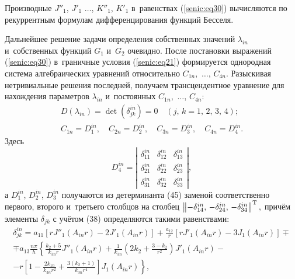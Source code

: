 Производные ${J}''_1$, ${J}'_1$ $\dots$, ${K}''_1$, ${K}'_1 $ в~равенствах (\ref{senic:eq30}) 
вычисляются по рекуррентным формулам дифференцирования функций Бесселя.

Дальнейшее решение задачи определения собственных значений $\lambda _{in} $ 
и~собственных функций $G_1 $ и~$G_2 $ очевидно. После постановки выражений 
(\ref{senic:eq30}) в~граничные условия (\ref{senic:eq21}) формируется однородная система алгебраических 
уравнений относительно $C_{1n}$,~$\dots$, $C_{4n}$. Разыскивая нетривиальные 
решения последней, получаем трансцендентное уравнение для нахождения 
параметров $\lambda _{in}$ и~постоянных $C_{1n}$,~$\dots$, $C_{4n}$:
\begin{gather}
\label{senic:eq31}
D\left( {\lambda _{in} } \right) = \det \left( {\delta _{jk}^{in} } \right) 
= 0\quad (j,\,k = 1,\,2,\,3,\,4);\\
\label{senic:eq32}
C_{1n} = D_1^{in},\quad C_{2n} = D_2^{in},\quad C_{3n} = D_3^{in},\quad C_{4n} = D_4^{in}.
\end{gather}
Здесь 
\begin{equation}
\label{senic:eq33}
D_4^{in} = \left| {\begin{array}{lll}
 \delta _{11}^{in} & \delta _{12}^{in} &\delta _{13}^{in} \\ 
 \delta _{21}^{in} &\delta _{22}^{in} &\delta _{23}^{in} \\ 
 \delta _{31}^{in} &\delta _{32}^{in} &\delta _{33}^{in} 
 \end{array}} \right|,
\end{equation}
а $D_1^{in}$, $D_2^{in}$, $D_3^{in}$ получаются из детерминанта (45) заменой 
соответственно первого, второго и~третьего столбцов на столбец 
$\left\| { - \delta _{14}^{in},\, - \delta _{24}^{in},\, - \delta _{34}^{in} } \right\|^{\rm T},$ 
причём элементы $\delta _{jk} $ с учётом (38) определяются такими 
равенствами:
\begin{multline}
\delta _{jk}^{in} = a_{11} \left[ {r{J}''_1 \left( {A_{in} r} \right) - 
2{J}'_1 \left( {A_{in} r} \right)} \right] + \frac{a_{12} }{r}\left[ 
{r{J}'_1 \left( {A_{in} r} \right) - 3J_1 \left( {A_{in} r} \right)} \right] 
\mp \\ 
\mp a_{13} \frac{n\pi }{h}\left\{ {\frac{k_2 + 5}{k_{3n} r}} {J}''_1 
\left( {A_{in} r} \right) + \frac{1}{k_{3n} }\left( {2k_2 + \frac{3 - k_2 
}{r^2}} \right){J}'_1 \left( {A_{in} r} \right) -\right.\\-\left. r\left[ {1 - \frac{2k_{1n} 
}{k_{3n} r^2} + \frac{3\left( {k_2 + 1} \right)}{k_{3n} r^4}} \right]J_1 
 {\left( {A_{in} r} \right)} \right\}, 
\end{multline}
